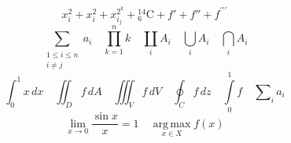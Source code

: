 \documentclass{article}
\begin{document}
\[x_i^2+x^2_i+x_{i_j}^{2^k}+{}^{14}_{6}\mathrm{C}+f'+f''+f^{\prime\prime\prime}\]
\[\sum_{\substack{1\le i\le n\\i\ne j}}a_i\quad\prod_{k=1}^{n}k\quad\coprod_i A_i\quad\bigcup_i A_i\quad\bigcap_i A_i\]
\[\int_0^1x\,dx\quad\iint_D f\,dA\quad\iiint_V f\,dV\quad\oint_C f\,dz\quad\int\limits_0^1 f\quad\sum\nolimits_i a_i\]
\[\lim_{x\to0}\frac{\sin x}{x}=1\quad\operatorname*{arg\,max}_{x\in X}f(x)\]
\end{document}
